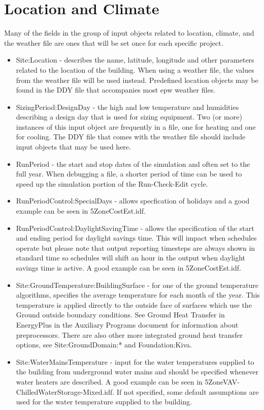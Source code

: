 \section{Location and Climate}

Many of the fields in the group of input objects related to location,
climate, and the weather file are ones that will be set once for each
specific project.
\begin{itemize}
\item Site:Location - describes the name, latitude, longitude and other
parameters related to the location of the building. When using a weather
file, the values from the weather file will be used instead. Predefined
location objects may be found in the DDY file that accompanies most
epw weather files.
\item SizingPeriod:DesignDay - the high and low temperature and humidities
describing a design day that is used for sizing equipment. Two (or
more) instances of this input object are frequently in a file, one
for heating and one for cooling. The DDY file that comes with the
weather file should include input objects that may be used here.
\item RunPeriod - the start and stop dates of the simulation and often set
to the full year. When debugging a file, a shorter period of time
can be used to speed up the simulation portion of the Run-Check-Edit
cycle.
\item RunPeriodControl:SpecialDays - allows specfication of holidays and
a good example can be seen in 5ZoneCostEst.idf. 
\item RunPeriodControl:DaylightSavingTime - allows the specification of
the start and ending period for daylight savings time. This will impact
when schedules operate but please note that output reporting timesteps
are always shown in standard time so schedules will shift an hour
in the output when daylight savings time is active. A good example
can be seen in 5ZoneCostEst.idf.
\item Site:GroundTemperature:BuildingSurface - for one of the ground temperature
algorithms, specifies the average temperature for each month of the
year. This temperature is applied directly to the outside face of
surfaces which use the \textquotedbl Ground\textquotedbl{} outside
boundary conditions. See \textquotedbl Ground Heat Transfer in EnergyPlus\textquotedbl{}
in the Auxiliary Programs document for information about preprocessors.
There are also other more integrated ground heat transfer options,
see Site:GroundDomain:{*} and Foundation:Kiva.
\item Site:WaterMainsTemperature - input for the water temperatures supplied
to the building from underground water mains and should be specified
whenever water heaters are described. A good example can be seen in
5ZoneVAV-ChilledWaterStorage-Mixed.idf. If not specified, some default
assumptions are used for the water temperature supplied to the building.
\end{itemize}




